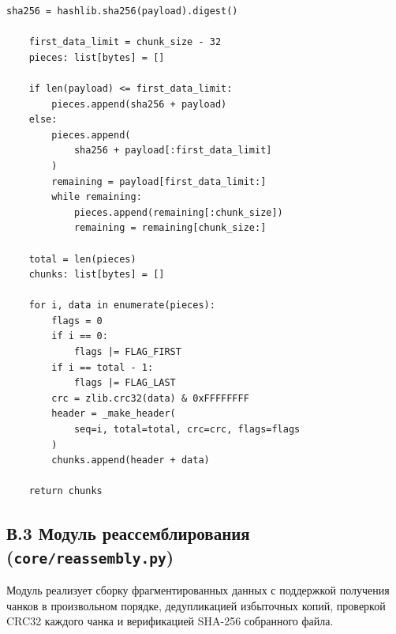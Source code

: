 \begin{lstlisting}[style=appendixcode]
    sha256 = hashlib.sha256(payload).digest()

    first_data_limit = chunk_size - 32
    pieces: list[bytes] = []

    if len(payload) <= first_data_limit:
        pieces.append(sha256 + payload)
    else:
        pieces.append(
            sha256 + payload[:first_data_limit]
        )
        remaining = payload[first_data_limit:]
        while remaining:
            pieces.append(remaining[:chunk_size])
            remaining = remaining[chunk_size:]

    total = len(pieces)
    chunks: list[bytes] = []

    for i, data in enumerate(pieces):
        flags = 0
        if i == 0:
            flags |= FLAG_FIRST
        if i == total - 1:
            flags |= FLAG_LAST
        crc = zlib.crc32(data) & 0xFFFFFFFF
        header = _make_header(
            seq=i, total=total, crc=crc, flags=flags
        )
        chunks.append(header + data)

    return chunks
\end{lstlisting}

\newpage
\subsection*{В.3 Модуль реассемблирования (\texttt{core/reassembly.py})}

Модуль реализует сборку фрагментированных данных с поддержкой
получения чанков в произвольном порядке, дедупликацией избыточных
копий, проверкой CRC32 каждого чанка и верификацией SHA-256
собранного файла.

